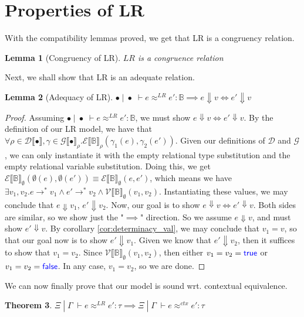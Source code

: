 \documentclass[a4paper, 11pt]{report}
\newtheorem{theorem}{Theorem}
\newtheorem{lemma}[theorem]{Lemma}
\theoremstyle{definition}
\newcommand{\Keyword}[1]{{\color{blue} \mathsf{#1}}}
\newcommand{\expr}{e}
\newcommand{\val}{v}
\newcommand{\True}{\Keyword{true}}
\newcommand{\False}{\Keyword{false}}
\newcommand{\Tbool}{\mathbb{B}}
\newcommand{\typ}{\tau}
\newcommand{\venv}{\Gamma}
\newcommand{\tenv}{\Xi}
\newcommand{\emptenv}{\bullet}
\newcommand{\empvenv}{\bullet}
\newcommand{\jdgRel}[6]{#1 \; | \; #2 \; \vdash #3 \approx^{#4} #5 : #6}
\newcommand{\ctxRel}[5]{\jdgRel{#1}{#2}{#3}{ctx}{#4}{#5}}
\newcommand{\stepS}{\rightarrow^*}
\newcommand{\ValInp}[2]{\mathcal{V} \llbracket #1 \rrbracket_{#2}}
\newcommand{\ExpInp}[2]{\mathcal{E} \llbracket #1 \rrbracket_{#2}}
\newcommand{\VenvInp}[2]{\mathcal{G} \llbracket #1 \rrbracket_{#2}}
\newcommand{\TenvInp}[1]{\mathcal{D} \llbracket #1 \rrbracket}
\newcommand{\LogRel}[5]{\jdgRel{#1}{#2}{#3}{LR}{#4}{#5}}
\begin{document}
\section{Properties of LR}
With the compatibility lemmas proved, we get that LR is a congruency relation.
\begin{lemma}[Congruency of LR]\label{lem:LR_cong}
  $LR$ is a congruence relation
\end{lemma}
Next, we shall show that LR is an adequate relation.
\begin{lemma}[Adequacy of LR]\label{lem:LR_adeq}
  $\LogRel{\emptenv}{\empvenv}{\expr}{\expr'}{\Tbool} \implies \expr \Downarrow \val \iff \expr' \Downarrow \val$
\end{lemma}
\begin{proof}
  Assuming $\LogRel{\emptenv}{\empvenv}{\expr}{\expr'}{\Tbool}$, we must show 
  $\expr \Downarrow \val \iff \expr' \Downarrow \val$. By the definition of our LR model, we have that $\forall \rho \in \TenvInp{\emptenv}, \gamma \in \VenvInp{\empvenv}{\rho} . \ExpInp{\Tbool}{\rho}(\gamma_1(\expr), \gamma_2(\expr'))$. Given our definitions of $\mathcal{D}$ and $\mathcal{G}$, we can only instantiate it with the empty relational type substitution and the empty relational variable substitution. Doing this, we get $\ExpInp{\Tbool}{\emptyset}(\emptyset(\expr), \emptyset(\expr')) \equiv \ExpInp{\Tbool}{\emptyset}(\expr, \expr')$, which means we have $\exists \val_1, \val_2 . \expr \stepS \val_1 \land \expr' \stepS \val_2 \land \ValInp{\Tbool}{\emptyset}(\val_1, \val_2)$. Instantiating these values, we may conclude that $\expr \Downarrow \val_1$, $\expr' \Downarrow \val_2$. Now, our goal is to show $\expr \Downarrow \val \iff \expr' \Downarrow \val$. Both sides are similar, so we show just the "$\implies$" direction. So we assume $\expr \Downarrow \val$, and must show $\expr' \Downarrow \val$. By corollary \ref{cor:determinacy_val}, we may conclude that $\val_1 = \val$, so that our goal now is to show $\expr' \Downarrow \val_1$. Given we know that $\expr' \Downarrow \val_2$, then it suffices to show that $\val_1 = \val_2$. Since $\ValInp{\Tbool}{\emptyset}(\val_1, \val_2)$, then either $\val_1 = \val_2 = \True$ or $\val_1 = \val_2 = \False$. In any case, $\val_1 = \val_2$, so we are done.
\end{proof}
We can now finally prove that our model is sound wrt. contextual equivalence.
\begin{theorem}\label{thm:LR_sound}
  $\LogRel{\tenv}{\venv}{\expr}{\expr'}{\typ} \implies \ctxRel{\tenv}{\venv}{\expr}{\expr'}{\typ}$
\end{theorem}
\end{document}
